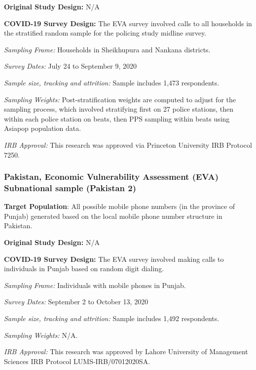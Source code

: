 \documentclass[
  12pt,
]{article}
\begin{document}
\textbf{Original Study Design:} N/A

\textbf{COVID-19 Survey Design:} The EVA survey involved calls to all households in the stratified random sample for the policing study midline survey.

\emph{Sampling Frame:} Households in Sheikhupura and Nankana districts.

\emph{Survey Dates:} July 24 to September 9, 2020

\emph{Sample size, tracking and attrition:} Sample includes 1,473 respondents.

\emph{Sampling Weights:} Post-stratification weights are computed to adjust for the sampling process, which involved stratifying first on 27 police stations, then within each police station on beats, then PPS sampling within beats using Asiapop population data.

\emph{IRB Approval:} This research was approved via Princeton University IRB Protocol 7250.

\hypertarget{pakistan-economic-vulnerability-assessment-eva-subnational-sample-pakistan-2}{%
\subsubsection*{Pakistan, Economic Vulnerability Assessment (EVA) Subnational sample (Pakistan 2)}\label{pakistan-economic-vulnerability-assessment-eva-subnational-sample-pakistan-2}}

\textbf{Target Population}: All possible mobile phone numbers (in the province of Punjab) generated based on the local mobile phone number structure in Pakistan.

\textbf{Original Study Design:} N/A

\textbf{COVID-19 Survey Design:} The EVA survey involved making calls to individuals in Punjab based on random digit dialing.

\emph{Sampling Frame:} Individuals with mobile phones in Punjab.

\emph{Survey Dates:} September 2 to October 13, 2020

\emph{Sample size, tracking and attrition:} Sample includes 1,492 respondents.

\emph{Sampling Weights:} N/A.

\emph{IRB Approval:} This research was approved by Lahore University of Management Sciences IRB Protocol LUMS-IRB/07012020SA.
\end{document}
